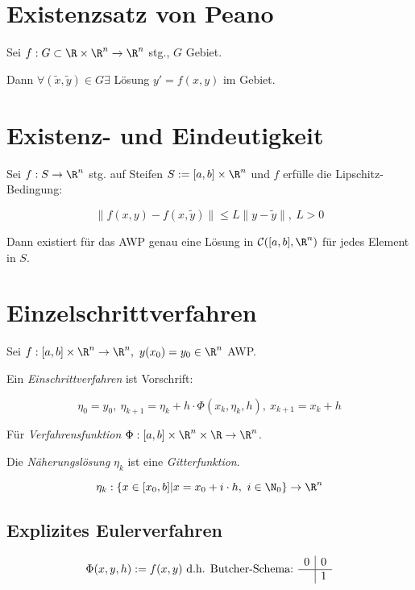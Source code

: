 \section*{Existenzsatz von Peano}

Sei $f : G \subset \R \times \R^n \to \R^n$ stg., $G$ Gebiet.

Dann $\forall (\tilde x,\tilde y) \in G \exists$ Lösung $y'=f(x,y)$ im Gebiet.

\section*{Existenz- und Eindeutigkeit}

Sei $f : S \to \R^n$ stg. auf Steifen $S := [a,b] \times \R^n$ und $f$ erfülle die Lipschitz-Bedingung:

\vspace*{-2mm}
$$\|f(x,y)-f(x,\tilde y)\| \leq L \|y-\tilde y\|, \ L > 0$$

Dann existiert für das AWP genau eine Lösung in $\mathcal{C}([a,b],\R^n)$ für jedes Element in $S$.

\section*{Einzelschrittverfahren}

Sei $f : [a,b] \times \R^n \to \R^n, \ y(x_0)=y_0 \in \R^n$ AWP.

Ein \emph{Einschrittverfahren} ist Vorschrift:

\vspace*{-4mm}
$$\eta_0 = y_0, \ \eta_{k+1} = \eta_k + h \cdot \Phi(x_k, \eta_k, h), \ x_{k+1} = x_k + h$$

Für \emph{Verfahrensfunktion} $\Phi : [a,b] \times \R^n \times \R \to \R^n$.

\spacing

Die \emph{Näherungslösung} $\eta_k$ ist eine \emph{Gitterfunktion}.

\vspace*{-4mm}
$$\eta_k : \{x \in [x_0,b] | x = x_0 + i \cdot h, \ i \in \N_0 \} \to \R^n$$

\subsection*{Explizites Eulerverfahren}

$$\Phi(x,y,h) := f(x,y) \text{ d.h. Butcher-Schema: } \begin{array}{c|c}
0 & 0 \\
\hline
  & 1
\end{array}$$

